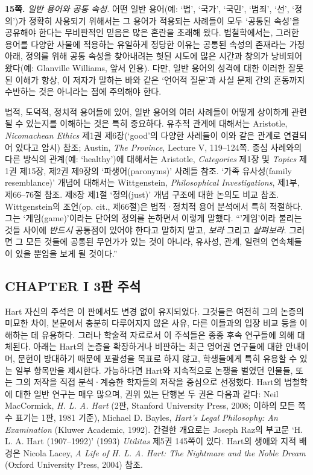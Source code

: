 \documentclass[12pt, oneside]{book}  %
\begin{document}
\textbf{15쪽.} \emph{일반 용어와 공통 속성.} 어떤 일반 용어(예: `법',
`국가', `국민', `범죄', `선', `정의')가 정확히 사용되기 위해서는 그
용어가 적용되는 사례들이 모두 `공통된 속성'을 공유해야 한다는 무비판적인
믿음은 많은 혼란을 초래해 왔다. 법철학에서는, 그러한 용어를 다양한
사물에 적용하는 유일하게 정당한 이유는 공통된 속성의 존재라는 가정 아래,
정의를 위해 공통 속성을 찾아내려는 헛된 시도에 많은 시간과 창의가
낭비되어 왔다(예: Glanville Williams, 앞서 인용). 다만, 일반 용어의
성격에 대한 이러한 잘못된 이해가 항상, 이 저자가 말하는 바와 같은
`언어적 질문'과 사실 문제 간의 혼동까지 수반하는 것은 아니라는 점에
주의해야 한다.

법적, 도덕적, 정치적 용어들에 있어, 일반 용어의 여러 사례들이 어떻게
상이하게 관련될 수 있는지를 이해하는 것은 특히 중요하다. 유추적 관계에
대해서는 Aristotle, \emph{Nicomachean Ethics} 제1권 제6장(`good'의
다양한 사례들이 이와 같은 관계로 연결되어 있다고 암시) 참조; Austin,
\emph{The Province}, Lecture V, 119--124쪽. 중심 사례와의 다른 방식의
관계(예: `healthy')에 대해서는 Aristotle, \emph{Categories} 제1장 및
\emph{Topics} 제1권 제15장, 제2권 제9장의 `파생어(paronyms)' 사례들
참조. `가족 유사성(family resemblance)' 개념에 대해서는 Wittgenstein,
\emph{Philosophical Investigations}, 제1부, 제66--76절 참조. 제8장 제1절
`정의(just)' 개념 구조에 대한 논의도 비교 참조. Wittgenstein의 조언(op.
cit., 제66절)은 법적·정치적 용어 분석에서 특히 적절하다. 그는
`게임(game)'이라는 단어의 정의를 논하면서 이렇게 말했다. ``'게임'이라
불리는 것들 사이에 \emph{반드시} 공통점이 있어야 한다고 말하지 말고,
\emph{보라} 그리고 \emph{살펴보라}. 그러면 그 모든 것들에 공통된
무언가가 있는 것이 아니라, 유사성, 관계, 일련의 연속체들이 있을 뿐임을
보게 될 것이다.''

\subsection{\texorpdfstring{\textbf{CHAPTER I 3판
주석}}{CHAPTER I 3판 주석}}\label{chapter-i-3uxd310-uxc8fcuxc11d}

Hart 자신의 주석은 이 판에서도 변경 없이 유지되었다. 그것들은 여전히
그의 논증의 미묘한 차이, 본문에서 충분히 다루어지지 않은 사유, 다른
이들과의 입장 비교 등을 이해하는 데 유용하다. 그러나 학술적 자료로서 이
주석들은 종종 후속 연구들에 의해 대체된다. 아래는 Hart의 논증을
확장하거나 비판하는 최근 영어권 연구들에 대한 안내이며, 문헌이 방대하기
때문에 포괄성을 목표로 하지 않고, 학생들에게 특히 유용할 수 있는 일부
항목만을 제시한다. 가능하다면 Hart와 지속적으로 논쟁을 벌였던 인물들,
또는 그의 저작을 직접 분석·계승한 학자들의 저작을 중심으로 선정했다.
Hart의 법철학에 대한 일반 연구는 매우 많으며, 권위 있는 단행본 두 권은
다음과 같다: Neil MacCormick, \emph{H. L. A. Hart} (2판, Stanford
University Press, 2008; 이하의 모든 쪽수 표기는 1판, 1981 기준), Michael
D. Bayles, \emph{Hart's Legal Philosophy: An Examination} (Kluwer
Academic, 1992). 간결한 개요로는 Joseph Raz의 부고문 `H. L. A. Hart
(1907--1992)' (1993) \emph{Utilitas} 제5권 145쪽이 있다. Hart의 생애와
지적 배경은 Nicola Lacey, \emph{A Life of H. L. A. Hart: The Nightmare
and the Noble Dream} (Oxford University Press, 2004) 참조.
\end{document}
